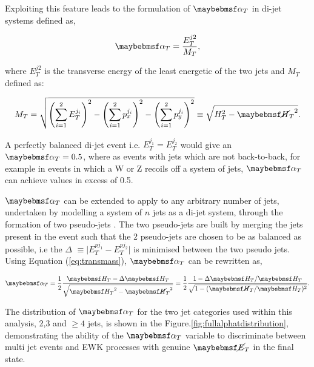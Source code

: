  Exploiting this feature leads to the formulation of $\alphat$ in di-jet systems defined as,

\begin{equation}
\alphat = \frac {E^{j2}_{T}}{M_{T}},
\end{equation} 

where $E^{j2}_{T}$ is the transverse energy of the least energetic of the two jets and $M_{T}$ defined as:

\begin{equation}
\label{eq:transmass}
M_{T} = \sqrt{\left(\sum^{2}_{i=1}E^{j_{i}}_{T}\right)^{2}-\left(\sum^{2}_{i=1}p^{j_{i}}_{x}\right)^{2}-\left(\sum^{2}_{i=1}p^{j_{i}}_{y}\right)^{2}} \equiv \sqrt{H_{T}^{2} - \mht^{2}} .
\end{equation}

A perfectly balanced di-jet event i.e. $E_{T}^{j_{1}} = E_{T}^{j_{2}}$ would give an $\alphat = 0.5$, where as events with jets which are not back-to-back, for example in events in which
a W or Z recoils off a system of jets, $\alphat$ can achieve values in excess of 0.5.

$\alphat$ can be extended to apply to any arbitrary number of jets, undertaken by modelling a system of $n$ jets as a di-jet system, through the formation of two pseudo-jets \cite{CMS-PAS-SUS-09-001}. The two pseudo-jets are built by merging the jets present in the event such that the 2 pseudo-jets are chosen to be as balanced as possible, i.e the $\Delta$ \theht $\equiv \lvert E_{T}^{pj_{1}} - E_{T}^{pj_{2}}\rvert$ is minimised between the two pseudo jets. Using Equation (\ref{eq:transmass}), $\alphat$ can be rewritten as,

\begin{equation}
\label{eq:alphatmht}
\alphat = \frac{1}{2} \frac {\theht - \Delta\theht}{\sqrt{\theht^{2}-\mht^{2}}}= \frac{1}{2}\frac{1-\Delta\theht/\theht}{\sqrt{1-(\mht/\theht)^{2}}}.
\end{equation}

The distribution of $\alphat$ for the two jet categories used within this analysis, 2,3 and $\geq 4$ jets, is shown in the Figure.\ref{fig:fullalphatdistribution}, demonstrating the ability of the $\alphat$ variable to discriminate between multi jet events and \ac{EWK} processes with genuine $\met$ in the final state.  

